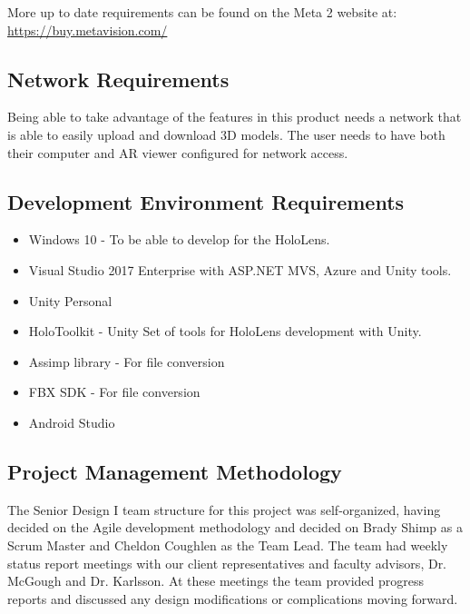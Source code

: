 More up to date requirements can be found on the Meta 2 website at: 
\url{https://buy.metavision.com/}

\subsection{Network Requirements}

Being able to take advantage of the features in this product needs a network
that is able to easily upload and download 3D models. The user needs to have
both their computer and AR viewer configured for network access.

\subsection{Development Environment Requirements}
\begin{itemize}
	\item Windows 10 - To be able to develop for the HoloLens.
	\item Visual Studio 2017 Enterprise with ASP.NET MVS, Azure and Unity tools.
	\item Unity Personal
	\item HoloToolkit - Unity Set of tools for HoloLens development with Unity.
	\item Assimp library - For file conversion
	\item FBX SDK - For file conversion
	\item Android Studio
\end{itemize}


\subsection{Project Management Methodology}
The Senior Design I team structure for this project was self-organized, having decided on the Agile development methodology and decided on Brady Shimp as a Scrum Master and Cheldon Coughlen as the Team Lead. The team had weekly status report meetings with our client representatives and faculty advisors, Dr. McGough and Dr. Karlsson. At these meetings the team provided progress reports and discussed any design modifications or complications moving forward.\\

